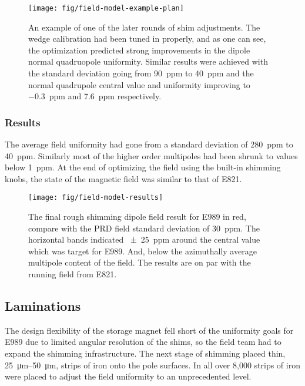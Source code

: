 \begin{figure}
\centering
\texttt{[image: fig/field-model-example-plan]}
\caption{
    An example of one of the later rounds of shim adjustments.  The wedge calibration had been tuned in properly, and as one can see, the optimization predicted strong improvements in the dipole normal quadruopole uniformity. Similar results were achieved with the standard deviation going from \SI{90}{ppm} to \SI{40}{ppm} and the normal quadrupole central value and uniformity improving to \SI{-0.3}{ppm} and \SI{7.6}{ppm} respectively.
    \label{fig:field-model-example-plan}
}
\end{figure}

\subsubsection{Results}

The average field uniformity had gone from a standard deviation of \SI{280}{ppm} to \SI{40}{ppm}.  Similarly most of the higher order multipoles had been shrunk to values below \SI{1}{ppm}.  At the end of optimizing the field using the built-in shimming knobs, the state of the magnetic field was similar to that of E821.  

\begin{figure}
\centering
\texttt{[image: fig/field-model-results]}
\caption{The final rough shimming dipole field result for E989 in red, compare with the PRD field standard deviation of \SI{30}{ppm}.  The horizontal bands indicated \SI{\pm 25}{ppm} around the central value which was target for E989.  And, below the azimuthally average multipole content of the field.  The results are on par with the running field from E821. \label{fig:field-model-results}}
\end{figure}

\subsection{Laminations}

The design flexibility of the storage magnet fell short of the uniformity goals for E989 due to limited angular resolution of the shims, so the field team had to expand the shimming infrastructure.  The next stage of shimming placed thin, \SIrange{25}{50}{\micro\meter}, strips of iron onto the pole surfaces.  In all over 8,000 strips of iron were placed to adjust the field uniformity to an unprecedented level.

